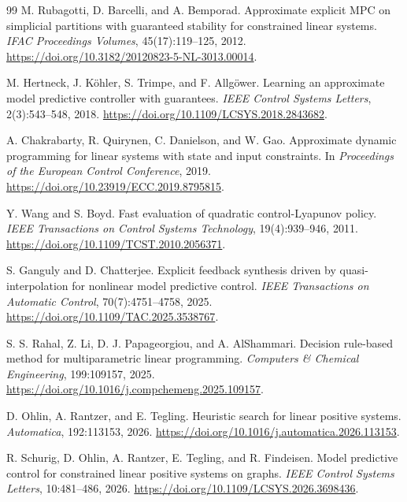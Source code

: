 \documentclass[10pt]{article}
\begin{document}
\begin{thebibliography}{99}
M. Rubagotti, D. Barcelli, and A. Bemporad.
\newblock Approximate explicit MPC on simplicial partitions with guaranteed stability for constrained linear systems.
\newblock \emph{IFAC Proceedings Volumes}, 45(17):119--125, 2012.
\newblock \url{https://doi.org/10.3182/20120823-5-NL-3013.00014}.

M. Hertneck, J. K\"ohler, S. Trimpe, and F. Allg\"ower.
\newblock Learning an approximate model predictive controller with guarantees.
\newblock \emph{IEEE Control Systems Letters}, 2(3):543--548, 2018.
\newblock \url{https://doi.org/10.1109/LCSYS.2018.2843682}.

A. Chakrabarty, R. Quirynen, C. Danielson, and W. Gao.
\newblock Approximate dynamic programming for linear systems with state and input constraints.
\newblock In \emph{Proceedings of the European Control Conference}, 2019.
\newblock \url{https://doi.org/10.23919/ECC.2019.8795815}.

Y. Wang and S. Boyd.
\newblock Fast evaluation of quadratic control-Lyapunov policy.
\newblock \emph{IEEE Transactions on Control Systems Technology}, 19(4):939--946, 2011.
\newblock \url{https://doi.org/10.1109/TCST.2010.2056371}.

S. Ganguly and D. Chatterjee.
\newblock Explicit feedback synthesis driven by quasi-interpolation for nonlinear model predictive control.
\newblock \emph{IEEE Transactions on Automatic Control}, 70(7):4751--4758, 2025.
\newblock \url{https://doi.org/10.1109/TAC.2025.3538767}.

S. S. Rahal, Z. Li, D. J. Papageorgiou, and A. AlShammari.
\newblock Decision rule-based method for multiparametric linear programming.
\newblock \emph{Computers \& Chemical Engineering}, 199:109157, 2025.
\newblock \url{https://doi.org/10.1016/j.compchemeng.2025.109157}.

D. Ohlin, A. Rantzer, and E. Tegling.
\newblock Heuristic search for linear positive systems.
\newblock \emph{Automatica}, 192:113153, 2026.
\newblock \url{https://doi.org/10.1016/j.automatica.2026.113153}.

R. Schurig, D. Ohlin, A. Rantzer, E. Tegling, and R. Findeisen.
\newblock Model predictive control for constrained linear positive systems on graphs.
\newblock \emph{IEEE Control Systems Letters}, 10:481--486, 2026.
\newblock \url{https://doi.org/10.1109/LCSYS.2026.3698436}.


\end{thebibliography}
\end{document}
